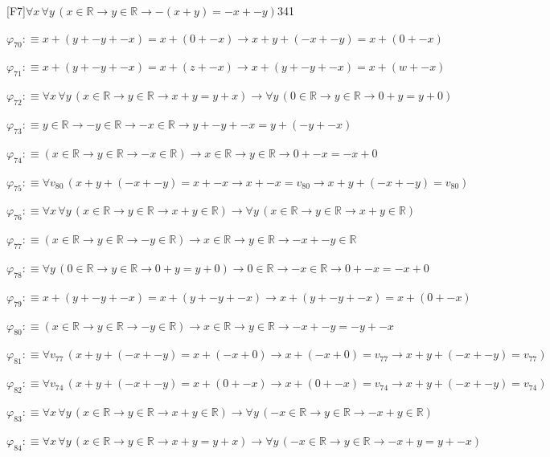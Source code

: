 \begin{fullproof}{[F7]}{$\forall x\,\forall y\,(x \in \mathbb{R} \to y \in \mathbb{R} \to -(x + y) = -x + -y)$}{341}
\begin{abbrevlist}
\item $\varphi_{70} :\equiv x + (y + -y + -x) = x + (0 + -x) \to x + y + (-x + -y) = x + (0 + -x)$
\item $\varphi_{71} :\equiv x + (y + -y + -x) = x + (z + -x) \to x + (y + -y + -x) = x + (w + -x)$
\item $\varphi_{72} :\equiv \forall x\,\forall y\,(x \in \mathbb{R} \to y \in \mathbb{R} \to x + y = y + x) \to \forall y\,(0 \in \mathbb{R} \to y \in \mathbb{R} \to 0 + y = y + 0)$
\item $\varphi_{73} :\equiv y \in \mathbb{R} \to -y \in \mathbb{R} \to -x \in \mathbb{R} \to y + -y + -x = y + (-y + -x)$
\item $\varphi_{74} :\equiv (x \in \mathbb{R} \to y \in \mathbb{R} \to -x \in \mathbb{R}) \to x \in \mathbb{R} \to y \in \mathbb{R} \to 0 + -x = -x + 0$
\item $\varphi_{75} :\equiv \forall v_{80}\,(x + y + (-x + -y) = x + -x \to x + -x = v_{80} \to x + y + (-x + -y) = v_{80})$
\item $\varphi_{76} :\equiv \forall x\,\forall y\,(x \in \mathbb{R} \to y \in \mathbb{R} \to x + y \in \mathbb{R}) \to \forall y\,(x \in \mathbb{R} \to y \in \mathbb{R} \to x + y \in \mathbb{R})$
\item $\varphi_{77} :\equiv (x \in \mathbb{R} \to y \in \mathbb{R} \to -y \in \mathbb{R}) \to x \in \mathbb{R} \to y \in \mathbb{R} \to -x + -y \in \mathbb{R}$
\item $\varphi_{78} :\equiv \forall y\,(0 \in \mathbb{R} \to y \in \mathbb{R} \to 0 + y = y + 0) \to 0 \in \mathbb{R} \to -x \in \mathbb{R} \to 0 + -x = -x + 0$
\item $\varphi_{79} :\equiv x + (y + -y + -x) = x + (y + -y + -x) \to x + (y + -y + -x) = x + (0 + -x)$
\item $\varphi_{80} :\equiv (x \in \mathbb{R} \to y \in \mathbb{R} \to -y \in \mathbb{R}) \to x \in \mathbb{R} \to y \in \mathbb{R} \to -x + -y = -y + -x$
\item $\varphi_{81} :\equiv \forall v_{77}\,(x + y + (-x + -y) = x + (-x + 0) \to x + (-x + 0) = v_{77} \to x + y + (-x + -y) = v_{77})$
\item $\varphi_{82} :\equiv \forall v_{74}\,(x + y + (-x + -y) = x + (0 + -x) \to x + (0 + -x) = v_{74} \to x + y + (-x + -y) = v_{74})$
\item $\varphi_{83} :\equiv \forall x\,\forall y\,(x \in \mathbb{R} \to y \in \mathbb{R} \to x + y \in \mathbb{R}) \to \forall y\,(-x \in \mathbb{R} \to y \in \mathbb{R} \to -x + y \in \mathbb{R})$
\item $\varphi_{84} :\equiv \forall x\,\forall y\,(x \in \mathbb{R} \to y \in \mathbb{R} \to x + y = y + x) \to \forall y\,(-x \in \mathbb{R} \to y \in \mathbb{R} \to -x + y = y + -x)$

\end{abbrevlist}
\end{fullproof}
